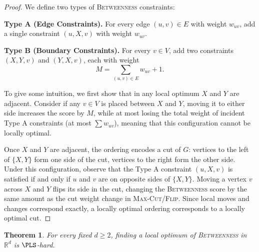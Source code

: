 \documentclass{article}
\theoremstyle{definition}  %
\theoremstyle{plain}
\newtheorem{remark}{Remark}
\newtheorem{theorem}{Theorem}
\numberwithin{observation}{section}
\numberwithin{claim}{section}
\numberwithin{fact}{section}
\numberwithin{lemma}{section}
\numberwithin{proposition}{section}
\numberwithin{theorem}{section}
\numberwithin{corollary}{section}
\numberwithin{definition}{section}
\theoremstyle{plain}
\begin{document}

\begin{proof}
    

    

We define two types of \textsc{Betweenness} constraints:

\textbf{Type A (Edge Constraints).} For every edge $(u, v) \in E$ with weight $w_{uv}$, add a single constraint $(u, X, v)$ with weight $w_{uv}$.

\textbf{Type B (Boundary Constraints).} For every $v \in V$, add two constraints $(X, Y, v)$ and $(Y, X, v)$, each with weight
\[
M = \sum_{(u,v) \in E} w_{uv} + 1.
\]

To give some intuition, we first show that in any local optimum $X$ and $Y$ are adjacent. Consider if any $v \in V$ is placed between $X$ and $Y$, moving it to either side increases the score by $M$, while at most losing the total weight of incident Type A constraints (at most $\sum w_{uv}$), meaning that this configuration cannot be locally optimal.

Once $X$ and $Y$ are adjacent, the ordering encodes a cut of $G$: vertices to the left of $\{X, Y\}$ form one side of the cut, vertices to the right form the other side. Under this configuration, observe that the Type A constraint $(u, X, v)$ is satisfied if and only if $u$ and $v$ are on opposite sides of $\{X, Y\}$. Moving a vertex $v$ across $X$ and $Y$ flips its side in the cut, changing the \textsc{Betweenness} score by the same amount as the cut weight change in \textsc{Max-Cut/Flip}. Since local moves and changes correspond exactly, a locally optimal ordering corresponds to a locally optimal cut.
\end{proof}





\begin{theorem}\label{thm:betweenness-high}
For every fixed $d \geq 2$, finding a local optimum of \textsc{Betweenness} in $\mathbb{R}^d$ is $\PLS$-hard.
\end{theorem}
\end{document}
